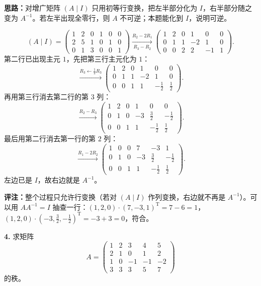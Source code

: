 \ifshowsolutions%
\textbf{思路：}对增广矩阵 \((A\mid I)\) 只用初等行变换，把左半部分化为 \(I\)，右半部分随之变为 \(A^{-1}\)。若左半出现全零行，则 \(A\) 不可逆；本题能化到 \(I\)，说明可逆。

\[
(A\mid I)=\left(\begin{array}{ccc|ccc}
1&2&0&1&0&0\\
2&5&1&0&1&0\\
0&1&3&0&0&1
\end{array}\right)
\xrightarrow[R_3-R_2]{R_2-2R_1}
\left(\begin{array}{ccc|ccc}
1&2&0&1&0&0\\
0&1&1&-2&1&0\\
0&0&2&2&-1&1
\end{array}\right).
\]
第二行已出现主元 \(1\)，先把第三行主元化为 \(1\)：
\[
\xrightarrow{R_3\leftarrow \frac12R_3}
\left(\begin{array}{ccc|ccc}
1&2&0&1&0&0\\
0&1&1&-2&1&0\\
0&0&1&1&-\frac12&\frac12
\end{array}\right).
\]
再用第三行消去第二行的第 \(3\) 列：
\[
\xrightarrow{R_2-R_3}
\left(\begin{array}{ccc|ccc}
1&2&0&1&0&0\\
0&1&0&-3&\frac32&-\frac12\\
0&0&1&1&-\frac12&\frac12
\end{array}\right).
\]
最后用第二行消去第一行的第 \(2\) 列：
\[
\xrightarrow{R_1-2R_2}
\left(\begin{array}{ccc|ccc}
1&0&0&7&-3&1\\
0&1&0&-3&\frac32&-\frac12\\
0&0&1&1&-\frac12&\frac12
\end{array}\right).
\]
左边已是 \(I\)，故右边就是 \(A^{-1}\)。

\textbf{评注：}整个过程只允许行变换（若对 \((A\mid I)\) 作列变换，右边就不再是 \(A^{-1}\)）。可以用 \(AA^{-1}=I\) 抽查一行：\((1,2,0)\cdot(7,-3,1)^{\mathrm T}=7-6=1\)，\((1,2,0)\cdot(-3,\frac32,-\frac12)^{\mathrm T}=-3+3=0\)，符合。

\else \answerarea[10] \fi%

\textbf{4.} 求矩阵
\[
A=\begin{pmatrix}
1&2&3&4&5\\
2&1&0&1&2\\
1&0&-1&-1&-2\\
3&3&3&5&7
\end{pmatrix}
\]
的秩。

